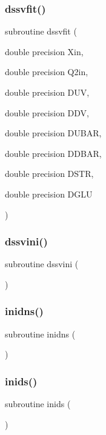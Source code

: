 \subsubsection{\texorpdfstring{dssvfit()}{dssvfit()}}
{\footnotesize\ttfamily subroutine dssvfit (\begin{DoxyParamCaption}\item[{double precision}]{Xin,  }\item[{double precision}]{Q2in,  }\item[{double precision}]{D\+UV,  }\item[{double precision}]{D\+DV,  }\item[{double precision}]{D\+U\+B\+AR,  }\item[{double precision}]{D\+D\+B\+AR,  }\item[{double precision}]{D\+S\+TR,  }\item[{double precision}]{D\+G\+LU }\end{DoxyParamCaption})}

\mbox{\label{polpdf_8f_a8e5f4c994c415921488124afc5dbf6d2}} 
\subsubsection{\texorpdfstring{dssvini()}{dssvini()}}
{\footnotesize\ttfamily subroutine dssvini (\begin{DoxyParamCaption}{ }\end{DoxyParamCaption})}

\mbox{\label{polpdf_8f_a9195a0db206c1f7311e8a0b5d6bf4e66}} 
\subsubsection{\texorpdfstring{inidns()}{inidns()}}
{\footnotesize\ttfamily subroutine inidns (\begin{DoxyParamCaption}{ }\end{DoxyParamCaption})}

\mbox{\label{polpdf_8f_a82b9b5d0217f872886739ce7c7755b92}} 
\subsubsection{\texorpdfstring{inids()}{inids()}}
{\footnotesize\ttfamily subroutine inids (\begin{DoxyParamCaption}{ }\end{DoxyParamCaption})}

